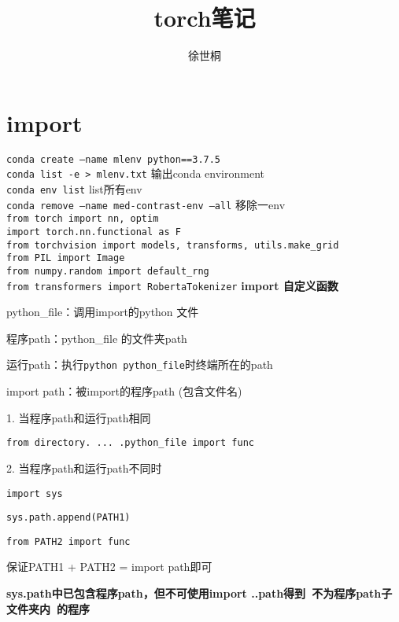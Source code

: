\documentclass[UTF8]{ctexart}
\title{torch笔记}
\author{徐世桐}
\date{}
\begin{document}
\maketitle

\section{import}
\noindent \texttt{conda create --name mlenv python==3.7.5}\\
\texttt{conda list -e > mlenv.txt} 输出conda environment\\
\texttt{conda env list} list所有env\\
\texttt{conda remove --name med-contrast-env --all} 移除一env\\
\texttt{from torch import nn, optim}\\
\texttt{import torch.nn.functional as F}\\
\texttt{from torchvision import models, transforms, utils.make\_grid}\\
\texttt{from PIL import Image}\\
\texttt{from numpy.random import default\_rng}\\
\texttt{from transformers import RobertaTokenizer}
\textbf{import 自定义函数}

  python\_file：调用import的python 文件

  程序path：python\_file 的文件夹path

  运行path：执行\texttt{python python\_file}时终端所在的path

  import path：被import的程序path (包含文件名)

  1. 当程序path和运行path相同

  \quad \texttt{from directory. ... .python\_file import func}

  2. 当程序path和运行path不同时

  \quad \texttt{import sys}

  \quad \texttt{sys.path.append(PATH1)}

  \quad \texttt{from PATH2 import func}

  \quad \quad 保证PATH1 + PATH2 = import path即可

  \quad \textbf{sys.path中已包含程序path，但不可使用import ..path得到\ 不为程序path子文件夹内\ 的程序}
\end{document}
